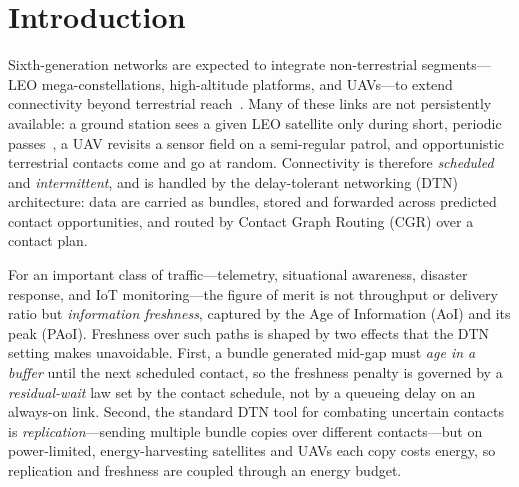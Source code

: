 \documentclass[twocolumn,3p,times,procedia]{elsarticle}
\begin{document}
\section{Introduction}
Sixth-generation networks are expected to integrate
non-terrestrial segments---LEO mega-constellations, high-altitude
platforms, and UAVs---to extend connectivity beyond terrestrial
reach~\cite{jiang2023sdn,ullah2025mgmt}.
Many of these links are not persistently available: a ground station
sees a given LEO satellite only during short, periodic
passes~\cite{he2026ngso}, a UAV
revisits a sensor field on a semi-regular patrol, and opportunistic
terrestrial contacts come and go at random. Connectivity is therefore
\emph{scheduled} and \emph{intermittent}, and is handled by the
delay-tolerant networking (DTN) architecture: data are carried as
bundles, stored and forwarded across predicted contact opportunities,
and routed by Contact Graph Routing (CGR) over a contact plan.

For an important class of traffic---telemetry, situational awareness,
disaster response, and IoT monitoring---the figure of merit is not
throughput or delivery ratio but \emph{information freshness}, captured
by the Age of Information (AoI) and its peak (PAoI). Freshness over such
paths is shaped by two effects that the DTN setting makes unavoidable.
First, a bundle generated mid-gap must \emph{age in a buffer} until the
next scheduled contact, so the freshness penalty is governed by a
\emph{residual-wait} law set by the contact schedule, not by a queueing
delay on an always-on link. Second, the standard DTN tool for combating
uncertain contacts is \emph{replication}---sending multiple bundle
copies over different contacts---but on power-limited, energy-harvesting
satellites and UAVs each copy costs energy, so replication and freshness
are coupled through an energy budget.
\end{document}
